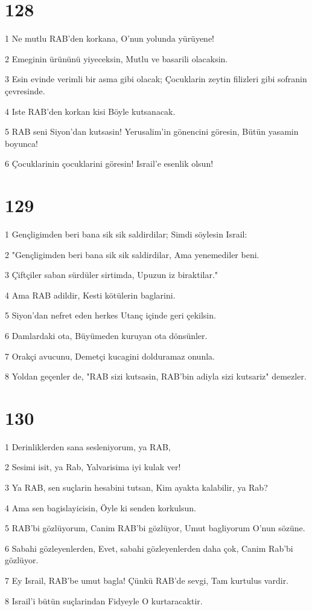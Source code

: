 \chapter{128}

\par 1 Ne mutlu RAB'den korkana, O'nun yolunda yürüyene!
\par 2 Emeginin ürününü yiyeceksin, Mutlu ve basarili olacaksin.
\par 3 Esin evinde verimli bir asma gibi olacak; Çocuklarin zeytin filizleri gibi sofranin çevresinde.
\par 4 Iste RAB'den korkan kisi Böyle kutsanacak.
\par 5 RAB seni Siyon'dan kutsasin! Yerusalim'in gönencini göresin, Bütün yasamin boyunca!
\par 6 Çocuklarinin çocuklarini göresin! Israil'e esenlik olsun!

\chapter{129}

\par 1 Gençligimden beri bana sik sik saldirdilar; Simdi söylesin Israil:
\par 2 "Gençligimden beri bana sik sik saldirdilar, Ama yenemediler beni.
\par 3 Çiftçiler saban sürdüler sirtimda, Upuzun iz biraktilar."
\par 4 Ama RAB adildir, Kesti kötülerin baglarini.
\par 5 Siyon'dan nefret eden herkes Utanç içinde geri çekilsin.
\par 6 Damlardaki ota, Büyümeden kuruyan ota dönsünler.
\par 7 Orakçi avucunu, Demetçi kucagini dolduramaz onunla.
\par 8 Yoldan geçenler de, "RAB sizi kutsasin, RAB'bin adiyla sizi kutsariz" demezler.

\chapter{130}

\par 1 Derinliklerden sana sesleniyorum, ya RAB,
\par 2 Sesimi isit, ya Rab, Yalvarisima iyi kulak ver!
\par 3 Ya RAB, sen suçlarin hesabini tutsan, Kim ayakta kalabilir, ya Rab?
\par 4 Ama sen bagislayicisin, Öyle ki senden korkulsun.
\par 5 RAB'bi gözlüyorum, Canim RAB'bi gözlüyor, Umut bagliyorum O'nun sözüne.
\par 6 Sabahi gözleyenlerden, Evet, sabahi gözleyenlerden daha çok, Canim Rab'bi gözlüyor.
\par 7 Ey Israil, RAB'be umut bagla! Çünkü RAB'de sevgi, Tam kurtulus vardir.
\par 8 Israil'i bütün suçlarindan Fidyeyle O kurtaracaktir.

